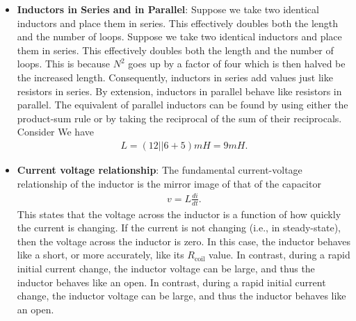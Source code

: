 \documentclass{report}
\begin{document}
\begin{itemize}
            \bigbreak \noindent 
            The standard symbol is at the top. The variable inductor symbol is in the middle and is a two lead device, somewhat reminiscent of the symbol for a rheostat. At the bottom is the symbol for an inductor with an iron, ferrite, or similar high permeability core. In general, like resistors, single inductors are not polarized and cannot be inserted into a circuit backwards. There are, however, special applications where multiple coils can be wound on a common core, and for these, the polarity of their interconnection can make a difference.
        \item \textbf{Inductors in Series and in Parallel}: Suppose we take two identical inductors and place them in series. This effectively doubles both the length and the number of loops. 
            \bigbreak \noindent 
            Suppose we take two identical inductors and place them in series. This effectively doubles both the length and the number of loops. This is because $N^{2}$ goes up by a factor of four which is then halved be the increased length. Consequently, inductors in series add values just like resistors in series. By extension, inductors in parallel behave like resistors in parallel. The equivalent of parallel inductors can be found by using either the product-sum rule or by taking the reciprocal of the sum of their reciprocals. 
            \bigbreak \noindent 
            Consider
            \bigbreak \noindent 
            \bigbreak \noindent 
            We have
            \begin{align*}
                L = (12 || 6 + 5)mH = 9mH
            .\end{align*}
        \item \textbf{Current voltage relationship}: The fundamental current-voltage relationship of the inductor is the mirror image of that of the capacitor
            \begin{align*}
                v = L \frac{di}{dt}
            .\end{align*}
            This states that the voltage across the inductor is a function of how quickly the current is changing. If the current is not changing (i.e., in steady-state), then the voltage across the inductor is zero. In this case, the inductor behaves like a short, or more accurately, like its $R_{\text{coil}}$ value. In contrast, during a rapid initial current change, the inductor voltage can be large, and thus the inductor behaves like an open. In contrast, during a rapid initial current change, the inductor voltage can be large, and thus the inductor behaves like an open.

\end{itemize}
\end{document}
